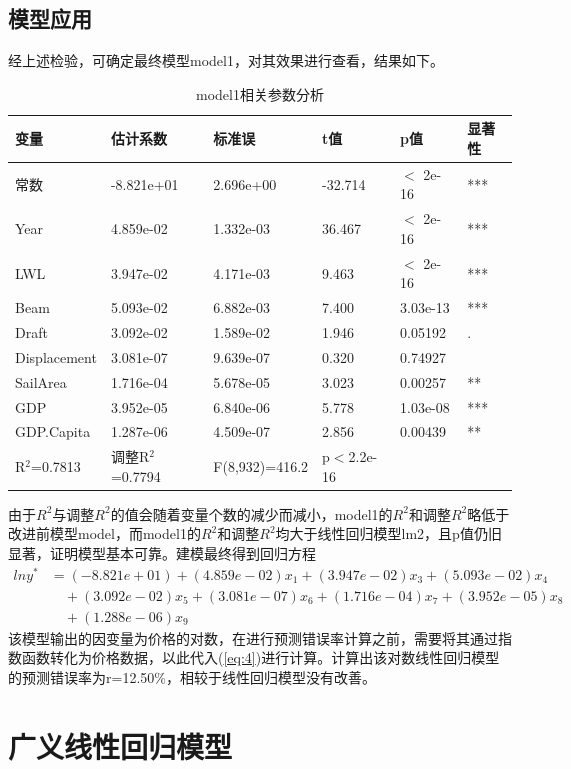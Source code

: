 \documentclass[a4paper,12pt,onecolumn,oneside]{article}
\begin{document}
\subsection{模型应用}
经上述检验，可确定最终模型model1，对其效果进行查看，结果如下。\par 
\begin{table}[h]
	\centering
	\caption{model1相关参数分析}\vspace{0.25\baselineskip}
	\label{tab:model1}
	\begin{tabular}{@{}llllll@{}}
		\toprule
		变量 & 估计系数 & 标准误 & t值 & p值 & 显著性 \\ \midrule
		常数 & -8.821e+01 & 2.696e+00 & -32.714 & $<$ 2e-16 & *** \\
		Year & 4.859e-02 & 1.332e-03 & 36.467 & $<$ 2e-16 & *** \\
		LWL & 3.947e-02 & 4.171e-03 & 9.463 & $<$ 2e-16 & *** \\
		Beam & 5.093e-02 & 6.882e-03 & 7.400 & 3.03e-13 & *** \\
		Draft & 3.092e-02 & 1.589e-02 & 1.946 & 0.05192 & . \\
		Displacement & 3.081e-07 & 9.639e-07 & 0.320 & 0.74927 & \\
		SailArea & 1.716e-04 & 5.678e-05 & 3.023 & 0.00257 & ** \\
		GDP & 3.952e-05 & 6.840e-06 & 5.778 & 1.03e-08 & *** \\
		GDP.Capita & 1.287e-06 & 4.509e-07 & 2.856 & 0.00439 & ** \\ \midrule
		R$^2$=0.7813 & 调整R$^2$=0.7794 & F(8,932)=416.2 & p$<$2.2e-16 & & \\
		\bottomrule
	\end{tabular}
\end{table}
由于$R^2$与调整$R^2$的值会随着变量个数的减少而减小，model1的$R^2$和调整$R^2$略低于改进前模型model，而model1的$R^2$和调整$R^2$均大于线性回归模型lm2，且p值仍旧显著，证明模型基本可靠。建模最终得到回归方程
\begin{align}
	ln y^{*} &=(-8.821e+01)+(4.859e-02) x_1+(3.947e-02) x_3+(5.093e-02) x_4 \nonumber \\
	&\quad +(3.092e-02) x_5+(3.081e-07) x_6+(1.716e-04) x_7+(3.952e-05) x_8 \nonumber \\
	&\quad+( 1.288e-06) x_9
\end{align}
该模型输出的因变量为价格的对数，在进行预测错误率计算之前，需要将其通过指数函数转化为价格数据，以此代入(\ref{eq:4})进行计算。计算出该对数线性回归模型的预测错误率为r=12.50\%，相较于线性回归模型没有改善。
\section{广义线性回归模型}
\end{document}
